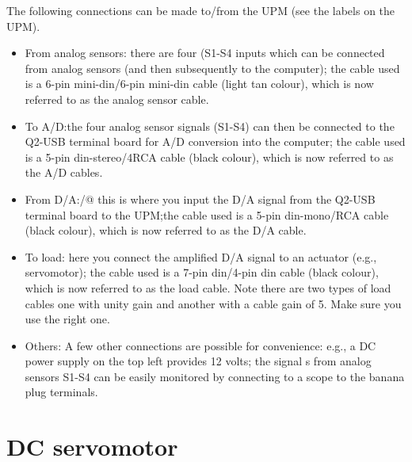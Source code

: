 The following connections can be made to/from the UPM (see the labels on the
UPM).
\begin{itemize}
    \item From analog sensors: there are four (S1-S4 inputs which can be
          connected from analog sensors (and then subsequently to the computer); the
          cable used is a 6-pin mini-din/6-pin mini-din cable (light tan colour), which
          is now referred to as the analog sensor cable.

    \item To A/D:\@ the four analog sensor signals (S1-S4) can then be connected to
          the Q2-USB terminal board for A/D conversion into the computer; the cable
          used is a 5-pin din-stereo/4RCA cable (black colour), which is now referred to
          as the A/D cables.

    \item From D/A:/@ this is where you input the D/A signal from the Q2-USB
          terminal board to the UPM;\@ the cable used is a 5-pin din-mono/RCA cable
          (black colour), which is now referred to as the D/A cable.

    \item To load: here you connect the amplified D/A signal to an actuator
          (e.g., servomotor); the cable used is a 7-pin din/4-pin din cable (black
          colour), which is now referred to as the load cable.  Note there are two types
          of load cables one with unity gain and another with a cable gain of 5.  Make
          sure you use the right one.

    \item Others: A few other connections are possible for convenience: e.g., a
          DC power supply on the top left provides 12 volts; the signal s from analog
          sensors S1-S4 can be easily monitored by connecting to a scope to the banana
          plug terminals.
\end{itemize}

\section{DC servomotor}

